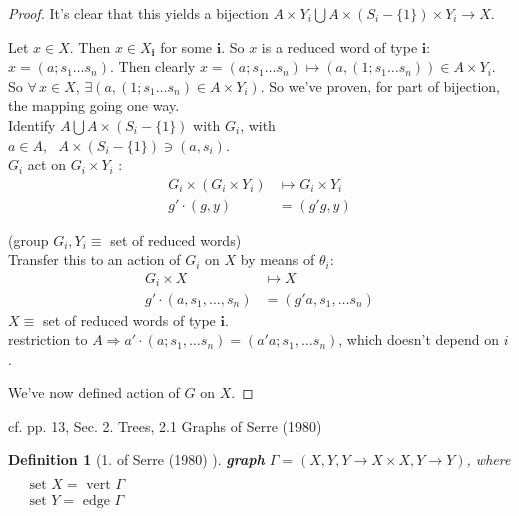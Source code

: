 \documentclass[10pt]{amsart}
\newtheorem{definition}{Definition}
\begin{document}
\begin{multicols*}{2}
\begin{proof}
It's clear that this yields a bijection $A\times Y_i \bigcup A\times (S_i - \lbrace 1 \rbrace) \times Y_i \to X$.  

Let $x\in X$.  Then $x\in X_{\mathbf{i}}$ for some $\mathbf{i}$.  So $x$ is a reduced word of type $\mathbf{i}$: $x = (a;s_1\dots s_n)$.  Then clearly $x = (a;s_1\dots s_n) \mapsto (a,(1;s_1\dots s_n)) \in A\times Y_i$.  So $\forall \, x \in X$, $\exists (a, (1; s_1 \dots s_n) \in A \times Y_i)$. So we've proven, for part of bijection, the mapping going one way. \\

Identify $A \bigcup A \times (S_i - \lbrace 1 \rbrace )$ with $G_i$, with \\
\phantom{Identify} $a \in A$, \, $A \times (S_i - \lbrace 1 \rbrace) \ni (a, s_i)$. \\

$G_i$ act on $G_i \times Y_i$ :  \\
\[
\begin{aligned}
G_i \times (G_i \times Y_i) & \mapsto G_i \times Y_i \\
g' \cdot (g, y) & = (g' g , y)
\end{aligned}
\]

(group $G_i, Y_i \equiv $ set of reduced words) \\

Transfer this to an action of $G_i$ on $X$ by means of $\theta_i$: \\
\[
\begin{aligned}
G_i \times X & \mapsto X \\
g' \cdot (a, s_1, \dots , s_n) & = (g'a, s_1 , \dots s_n) 
\end{aligned}
\]
$X \equiv $ set of reduced words of type $\mathbf{i}$. \\

restriction to $A \Longrightarrow a' \cdot (a; s_1 , \dots s_n ) = (a'a ; s_1, \dots s_n)$, which doesn't depend on $i$.

We've now defined action of $G$ on $X$.

\end{proof}


cf. pp. 13, Sec. 2. Trees, 2.1 Graphs of Serre (1980) \cite{Serr1980}

\begin{definition}[1. of Serre (1980) \cite{Serr1980}]
	\textbf{graph} $\Gamma = (X,Y, Y\to X\times X, Y\to Y)$, where $\begin{aligned} & \quad \\
		& \text{ set } X = \text{ vert } \Gamma \\ 
		& \text{ set } Y = \text{ edge } \Gamma \end{aligned}$  


\end{definition}
\end{multicols*}
\end{document}
